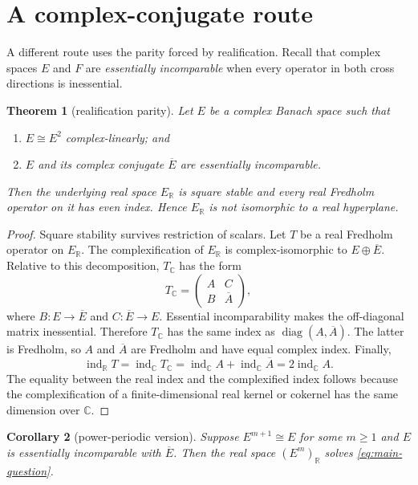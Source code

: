 \documentclass[11pt]{article}
\newtheorem{theorem}{Theorem}[section]
\newtheorem{corollary}[theorem]{Corollary}
\theoremstyle{definition}
\theoremstyle{remark}
\newcommand{\B}{\mathcal B}
\newcommand{\ind}{\operatorname{ind}}
\begin{document}
\section{A complex-conjugate route}

A different route uses the parity forced by realification.  Recall that complex
spaces $E$ and $F$ are \emph{essentially incomparable} when every operator in
both cross directions is inessential.

\begin{theorem}[realification parity]\label{thm:realification}
Let $E$ be a complex Banach space such that
\begin{enumerate}[label=\textup{(\roman*)}]
\item $E\cong E^2$ complex-linearly; and
\item $E$ and its complex conjugate $\overline E$ are essentially incomparable.
\end{enumerate}
Then the underlying real space $E_{\mathbb R}$ is square stable and every real
Fredholm operator on it has even index.  Hence $E_{\mathbb R}$ is not
isomorphic to a real hyperplane.
\end{theorem}

\begin{proof}
Square stability survives restriction of scalars.  Let $T$ be a real Fredholm
operator on $E_{\mathbb R}$.  The complexification of $E_{\mathbb R}$ is
complex-isomorphic to $E\oplus\overline E$.  Relative to this decomposition,
$T_{\mathbb C}$ has the form
\[
 T_{\mathbb C}=
 \begin{pmatrix}A&C\\B&\overline A\end{pmatrix},
\]
where $B:E\to\overline E$ and $C:\overline E\to E$.  Essential
incomparability makes the off-diagonal matrix inessential.  Therefore
$T_{\mathbb C}$ has the same index as
$\operatorname{diag}(A,\overline A)$.  The latter is Fredholm, so $A$ and
$\overline A$ are Fredholm and have equal complex index.  Finally,
\[
 \ind_{\mathbb R}T
 =\ind_{\mathbb C}T_{\mathbb C}
 =\ind_{\mathbb C}A+\ind_{\mathbb C}\overline A
 =2\ind_{\mathbb C}A.
\]
The equality between the real index and the complexified index follows because
the complexification of a finite-dimensional real kernel or cokernel has the
same dimension over $\mathbb C$.
\end{proof}

\begin{corollary}[power-periodic version]\label{cor:complex-power}
Suppose $E^{m+1}\cong E$ for some $m\ge1$ and $E$ is essentially incomparable
with $\overline E$.  Then the real space $(E^m)_{\mathbb R}$ solves
\eqref{eq:main-question}.
\end{corollary}
\end{document}
